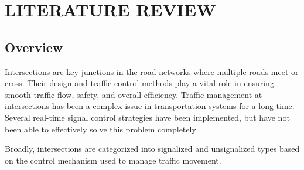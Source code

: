 \chapter{LITERATURE REVIEW}
\section{Overview}
Intersections are key junctions in the road networks where 
multiple roads meet or cross. Their design and traffic control 
methods play a vital role in ensuring smooth traffic flow, safety, 
and overall efficiency. Traffic management at intersections has 
been a complex issue in transportation systems for a long time. 
Several real-time signal control strategies have been implemented, 
but have not been able to effectively solve this problem completely 
\cite{tomar2022}.

Broadly, intersections are categorized into signalized and 
unsignalized types based on the control mechanism used to manage 
traffic movement.

